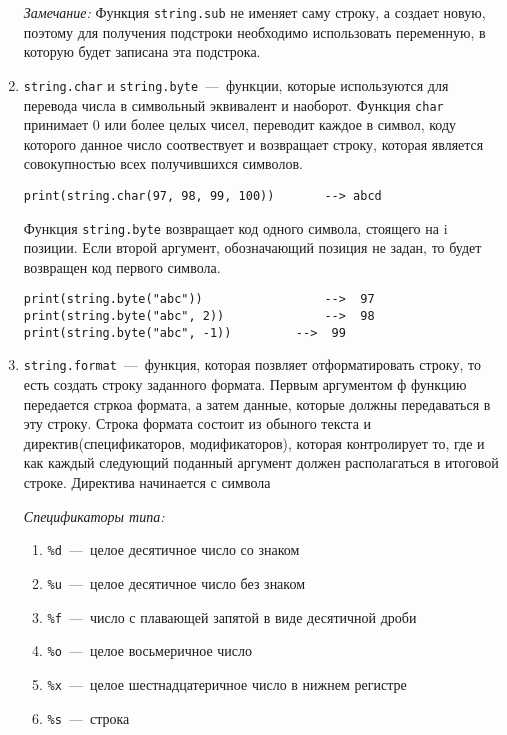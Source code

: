 \begin{enumerate}
\emph{Замечание:}
Функция \lstinline{string.sub} не именяет саму строку, а создает новую, поэтому для получения подстроки необходимо использовать переменную, в которую будет записана эта подстрока. 

	\item \lstinline{string.char} и \lstinline{string.byte}~---~функции, которые используются для перевода числа в символьный эквивалент и наоборот.
	 Функция \lstinline{char} принимает 0 или более целых чисел, переводит каждое в символ, коду которого данное число соотвествует и возвращает строку, которая является совокупностью всех получившихся символов. 
	
\begin{lstlisting}
print(string.char(97, 98, 99, 100))       --> abcd
\end{lstlisting} 

	Функция \lstinline{string.byte} возвращает код одного символа, стоящего на i позиции. Если второй аргумент, обозначающий позиция не задан, то будет возвращен код первого символа. 
	
\begin{lstlisting}
print(string.byte("abc"))                 -->  97
print(string.byte("abc", 2))              -->  98
print(string.byte("abc", -1))     	  -->  99
\end{lstlisting}
	
	\item \lstinline{string.format}~---~функция, которая позвляет отформатировать строку, то есть создать строку заданного формата. Первым аргументом ф функцию передается стркоа формата, а затем данные, которые должны передаваться в эту строку. Строка формата состоит из обыного текста и директив(спецификаторов, модификаторов), которая контролирует то, где и как каждый следующий поданный аргумент должен располагаться в итоговой строке. Директива начинается с символа %

\emph{Спецификаторы типа:}
\begin{enumerate}
	\item \lstinline{%d}~---~целое десятичное число со знаком
	\item \lstinline{%u}~---~целое десятичное число без знаком
	\item \lstinline{%f}~---~число с плавающей запятой в виде десятичной дроби
	\item \lstinline{%o}~---~целое восьмеричное число
	\item \lstinline{%x}~---~целое шестнадцатеричное число в нижнем регистре
	\item \lstinline{%s}~---~строка
\end{enumerate}


\end{enumerate}
